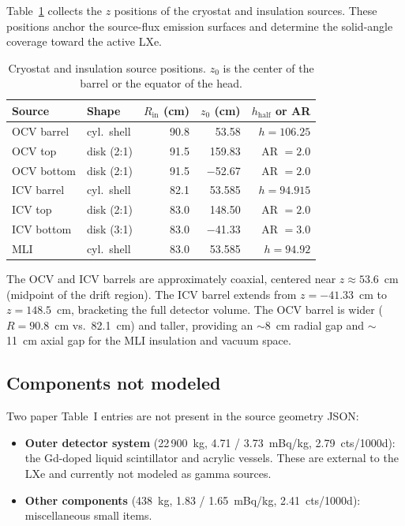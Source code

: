 \documentclass[11pt]{article}
\begin{document}
Table~\ref{tab:positions} collects the $z$ positions of the cryostat
and insulation sources.  These positions anchor the source-flux
emission surfaces and determine the solid-angle coverage toward the
active LXe.

\begin{table}[h]
\centering
\caption{Cryostat and insulation source positions.  $z_0$ is the
  center of the barrel or the equator of the head.}
\label{tab:positions}
\begin{tabular}{@{}llrrr@{}}
\toprule
{Source} & {Shape} & {$R_\text{in}$ (cm)} & {$z_0$ (cm)} &
  {$h_\text{half}$ or AR} \\
\midrule
OCV barrel   & cyl.\ shell & 90.8 & 53.58  & $h = 106.25$ \\
OCV top      & disk (2:1)  & 91.5 & 159.83 & AR $= 2.0$ \\
OCV bottom   & disk (2:1)  & 91.5 & $-$52.67 & AR $= 2.0$ \\
ICV barrel   & cyl.\ shell & 82.1 & 53.585 & $h = 94.915$ \\
ICV top      & disk (2:1)  & 83.0 & 148.50 & AR $= 2.0$ \\
ICV bottom   & disk (3:1)  & 83.0 & $-$41.33 & AR $= 3.0$ \\
MLI          & cyl.\ shell & 83.0 & 53.585 & $h = 94.92$ \\
\bottomrule
\end{tabular}
\end{table}

The OCV and ICV barrels are approximately coaxial, centered near
$z \approx 53.6$~cm (midpoint of the drift region).  The ICV barrel
extends from $z = -41.33$~cm to $z = 148.5$~cm, bracketing the full
detector volume.  The OCV barrel is wider ($R = 90.8$~cm vs.\
82.1~cm) and taller, providing an $\sim$8~cm radial gap and
$\sim$11~cm axial gap for the MLI insulation and vacuum space.

\subsection{Components not modeled}

Two paper Table~I entries are not present in the source geometry JSON:

\begin{itemize}
\item \textbf{Outer detector system} (22\,900~kg, 4.71 / 3.73~mBq/kg,
  2.79~cts/1000d): the Gd-doped liquid scintillator and acrylic
  vessels.  These are external to the LXe and currently not modeled as
  gamma sources.

\item \textbf{Other components} (438~kg, 1.83 / 1.65~mBq/kg,
  2.41~cts/1000d): miscellaneous small items.
\end{itemize}
\end{document}
